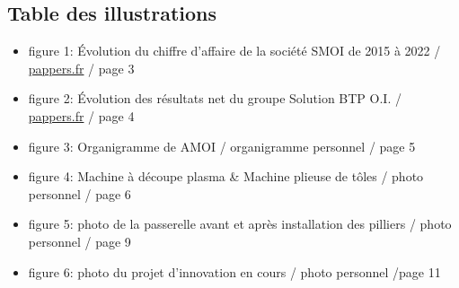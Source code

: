 \newpage
{}
\begin{center}
    \section{Table des illustrations}
\end{center}
\begin{itemize}
    \item figure 1: Évolution du chiffre d'affaire de la société SMOI de 2015 à 2022 / \href{https://www.pappers.fr/entreprise/smoi-societe-montage-ocean-indien-439139668}{pappers.fr} / page 3
    \item figure 2: Évolution des résultats net du groupe Solution BTP O.I. / \href{https://www.pappers.fr/entreprise/solutions-btp-oi-819693706}{pappers.fr} / page 4
    \item figure 3: Organigramme de AMOI / organigramme personnel / page 5
    \item figure 4: Machine à découpe plasma \& Machine plieuse de tôles / photo personnel / page 6
    \item figure 5: photo de la passerelle avant et après installation des pilliers / photo personnel / page 9
    \item figure 6: photo du projet d'innovation en cours / photo personnel /page 11
\end{itemize}
